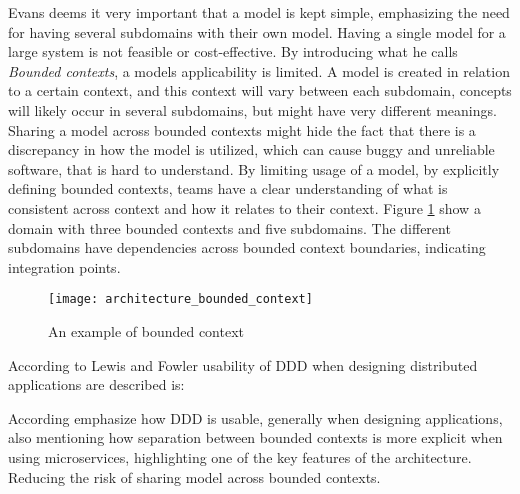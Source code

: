 Evans deems it very important that a model is kept simple, emphasizing the need for having several subdomains with their own model. Having a single model for a large system is not feasible or cost-effective\cite[p.~331]{evans2004domain}. By introducing what he calls \textit{Bounded contexts}, a models applicability is limited. A model is created in relation to a certain context, and this context will vary between each subdomain, concepts will likely occur in several subdomains, but might have very different meanings. Sharing a model across bounded contexts might hide the fact that there is a discrepancy in how the model is utilized, which can cause buggy and unreliable software, that is hard to understand. By limiting usage of a model, by explicitly defining bounded contexts, teams have a clear understanding of what is consistent across context and how it relates to their context\cite[p.~331]{evans2004domain}. Figure \ref{fig:architecture_bounded_context} show a domain with three bounded contexts and five subdomains. The different subdomains have dependencies across bounded context boundaries, indicating integration points.

\begin{figure}[!htb]
  \texttt{[image: architecture\_bounded\_context]}  
  \caption{An example of bounded context}
  \label{fig:architecture_bounded_context}
\end{figure}


According to Lewis and Fowler\cite{fowler2014microservices} usability of DDD when designing distributed applications are described is:


According  emphasize how DDD is usable, generally when designing applications, also mentioning how separation between bounded contexts is more explicit when using microservices, highlighting one of the key features of the architecture. Reducing the risk of sharing model across bounded contexts.

